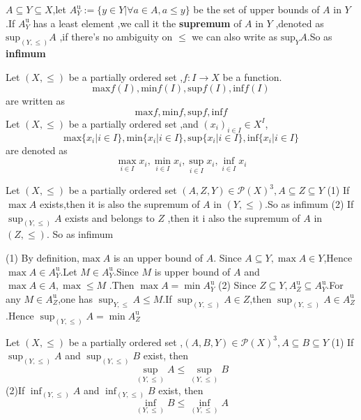 \documentclass{book}
\begin{document}
\begin{definitionenv}
    $A\subseteq Y\subseteq X$,let $A_Y^\mathrm{u}:=\{y\in Y|\forall a\in A,a\le y\}$ be the set of upper bounds of $A$ in $Y$.If $A_Y^\mathrm{u}$ has a least element ,we call it the \textbf{supremum} of $A$ in $Y$ ,denoted as $\mathrm{sup}_{(Y,\le)}A$ ,if there's no ambiguity on $\le$ we can also write as $\mathrm{sup}_{Y}A$.So as \textbf{infimum}
\end{definitionenv}
\begin{notationenv}
    
         Let $(X,\le)$ be a partially ordered set ,$f:I\rightarrow X$ be a function.$$\mathrm{max}f(I),\mathrm{min}f(I),\mathrm{sup}f(I),\mathrm{inf}f(I)$$ are written as $$\mathrm{max}f,\mathrm{min}f,\mathrm{sup}f,\mathrm{inf}f$$
         Let $(X,\le)$ be a partially ordered set ,and $(x_i)_{i\in I}\in X^I$,$$\mathrm{max}\{x_i|i\in I\},\mathrm{min}\{x_i|i\in I\},\mathrm{sup}\{x_i|i\in I\},\mathrm{inf}\{x_i|i\in I\}$$ are denoted as $$\max _{i\in I}x_i,\min _{i\in I}x_i,\sup _{i\in I}x_i,\inf _{i\in I}x_i$$
    
\end{notationenv}
\begin{propositionenv}
    Let $(X,\le)$ be a partially ordered set $(A,Z,Y)\in \mathcal{P} (X)^3,A\subseteq Z\subseteq Y$
    \newline
   (1) If $\max A$ exists,then it is also the supremum of $A$ in $(Y,\le)$.So as infimum
    \newline
    (2) If $\sup_{(Y,\le)}A$ exists and belongs to $Z$ ,then it i also the supremum of $A$ in $(Z,\le)$. So as infimum
\end{propositionenv}
\begin{proofenv}
    \quad \newline
   (1) By definition,$\max A $ is an upper bound of $A$. Since $A\subseteq Y, \max A \in Y$,Hence $\max A\in A_Y^\mathrm{u}$.Let $M\in A_Y^\mathrm{u} $.Since $M$ is upper bound of $A$ and $\max A\in A,\max\le M$ .Then $\max A=\min A_Y^\mathrm{u}$
\newline
(2) Since $Z\subseteq Y,A_Z^\mathrm{u}\subseteq A_Y^\mathrm{u}$.For any $M\in A_Z^\mathrm{u}$,one has $\sup _{Y,\le}A\le M$.If $\sup_{(Y,\le)}A\in Z$,then $\sup_{(Y,\le)}A\in A_Z^\mathrm{u}$.Hence $\sup _{(Y,\le)}A=\min A_Z^\mathrm{u}$
\end{proofenv}
\begin{propositionenv}
    Let $(X,\le )$ be a partially ordered set ,$(A,B,Y)\in \mathcal{P} (X)^3,A\subseteq B\subseteq Y$
    \newline
    (1) If $\sup_{(Y,\le)}A$ and $\sup_{(Y,\le)}B$ exist, then $$\sup_{(Y,\le)}A \le \sup_{(Y,\le)}B$$
    \newline
    (2)If $\inf_{(Y,\le)}A$ and $\inf_{(Y,\le)}B$ exist, then $$\inf_{(Y,\le)}B \le \inf_{(Y,\le)}A$$
    
\end{propositionenv}
\end{document}
